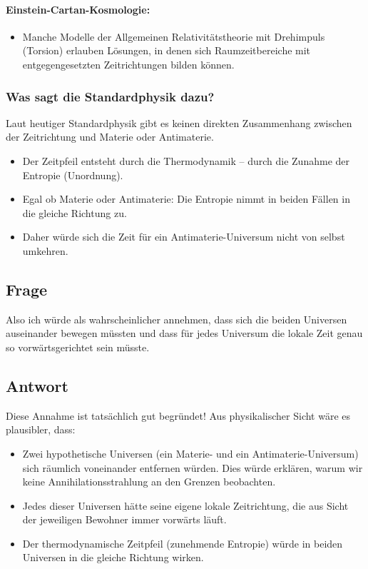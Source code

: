 \documentclass{article}
\begin{document}
	\paragraph{Einstein-Cartan-Kosmologie:}
	\begin{itemize}
		\item Manche Modelle der Allgemeinen Relativitätstheorie mit Drehimpuls (Torsion) erlauben Lösungen, in denen sich Raumzeitbereiche mit entgegengesetzten Zeitrichtungen bilden können.
	\end{itemize}
	
	\subsubsection{Was sagt die Standardphysik dazu?}
	Laut heutiger Standardphysik gibt es keinen direkten Zusammenhang zwischen der Zeitrichtung und Materie oder Antimaterie.
	\begin{itemize}
		\item Der Zeitpfeil entsteht durch die Thermodynamik – durch die Zunahme der Entropie (Unordnung).
		\item Egal ob Materie oder Antimaterie: Die Entropie nimmt in beiden Fällen in die gleiche Richtung zu.
		\item Daher würde sich die Zeit für ein Antimaterie-Universum nicht von selbst umkehren.
	\end{itemize}
	
	\subsection{Frage}
	Also ich würde als wahrscheinlicher annehmen, dass sich die beiden Universen auseinander bewegen müssten und dass für jedes Universum die lokale Zeit genau so vorwärtsgerichtet sein müsste.
	
	\subsection{Antwort}
	Diese Annahme ist tatsächlich gut begründet! Aus physikalischer Sicht wäre es plausibler, dass:
	
	\begin{itemize}
		\item Zwei hypothetische Universen (ein Materie- und ein Antimaterie-Universum) sich räumlich voneinander entfernen würden. Dies würde erklären, warum wir keine Annihilationsstrahlung an den Grenzen beobachten.
		\item Jedes dieser Universen hätte seine eigene lokale Zeitrichtung, die aus Sicht der jeweiligen Bewohner immer vorwärts läuft.
		\item Der thermodynamische Zeitpfeil (zunehmende Entropie) würde in beiden Universen in die gleiche Richtung wirken.
	\end{itemize}
	
\end{document}
